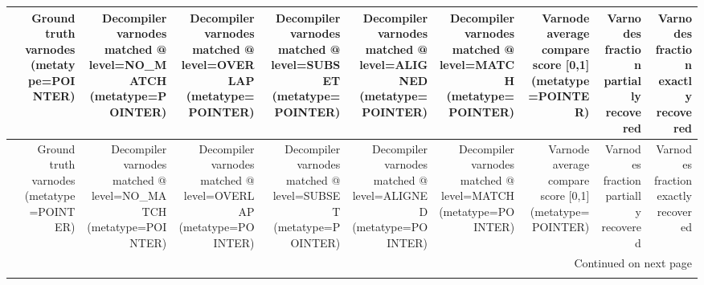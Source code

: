 \begin{longtable}{lrrrrrrrrr}
\toprule
{} &  Ground truth varnodes (metatype=POINTER) &  Decompiler varnodes matched @ level=NO\_MATCH (metatype=POINTER) &  Decompiler varnodes matched @ level=OVERLAP (metatype=POINTER) &  Decompiler varnodes matched @ level=SUBSET (metatype=POINTER) &  Decompiler varnodes matched @ level=ALIGNED (metatype=POINTER) &  Decompiler varnodes matched @ level=MATCH (metatype=POINTER) &  Varnode average compare score {[}0,1] (metatype=POINTER) &  Varnodes fraction partially recovered &  Varnodes fraction exactly recovered \\
\midrule
\endfirsthead

\toprule
{} &  Ground truth varnodes (metatype=POINTER) &  Decompiler varnodes matched @ level=NO\_MATCH (metatype=POINTER) &  Decompiler varnodes matched @ level=OVERLAP (metatype=POINTER) &  Decompiler varnodes matched @ level=SUBSET (metatype=POINTER) &  Decompiler varnodes matched @ level=ALIGNED (metatype=POINTER) &  Decompiler varnodes matched @ level=MATCH (metatype=POINTER) &  Varnode average compare score {[}0,1] (metatype=POINTER) &  Varnodes fraction partially recovered &  Varnodes fraction exactly recovered \\
\midrule
\endhead
\midrule
\multicolumn{10}{r}{{Continued on next page}} \\
\midrule
\endfoot


\end{longtable}
